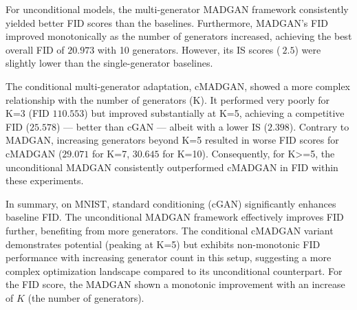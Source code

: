 For unconditional models, the multi-generator MADGAN framework consistently yielded better FID scores than the baselines. Furthermore, MADGAN's FID improved monotonically as the number of generators increased, achieving the best overall FID of $20.973$ with 10 generators. However, its IS scores ($~2.5$) were slightly lower than the single-generator baselines.

The conditional multi-generator adaptation, cMADGAN, showed a more complex relationship with the number of generators (K). It performed very poorly for K=3 (FID $110.553$) but improved substantially at K=5, achieving a competitive FID ($25.578$) — better than cGAN — albeit with a lower IS ($2.398$). Contrary to MADGAN, increasing generators beyond K=5 resulted in worse FID scores for cMADGAN ($29.071$ for K=7, $30.645$ for K=10). Consequently, for K>=5, the unconditional MADGAN consistently outperformed cMADGAN in FID within these experiments.

In summary, on MNIST, standard conditioning (cGAN) significantly enhances baseline FID. The unconditional MADGAN framework effectively improves FID further, benefiting from more generators. The conditional cMADGAN variant demonstrates potential (peaking at K=5) but exhibits non-monotonic FID performance with increasing generator count in this setup, suggesting a more complex optimization landscape compared to its unconditional counterpart. For the FID score, the MADGAN shown a monotonic improvement with an increase of $K$ (the number of generators).\\

